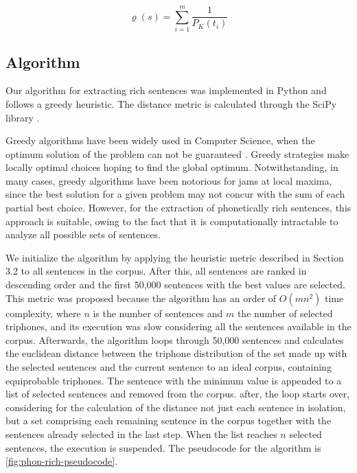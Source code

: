 \begin{equation}
\varrho(s) = \sum_{i=1}^{m} \frac{1}{P_K(t_i)}
\end{equation}


\subsection{Algorithm}

Our algorithm for extracting rich sentences was implemented in Python and follows a greedy heuristic. The distance
metric is calculated through the SciPy library \cite{Scipy2014}.

Greedy algorithms have been widely used in Computer Science, when the optimum solution of the problem can 
not be guaranteed \cite{Coppin2010}. Greedy strategies  make locally optimal choices hoping to find the global 
optimum. Notwithstanding, in many cases, greedy algorithms have been notorious for jams at local maxima, since the best solution 
for a given problem may not concur with the sum of each partial best choice. However, for the extraction of
phonetically rich sentences, this approach is suitable, owing to the fact that it is computationally intractable
to analyze all possible sets of sentences.

We initialize the algorithm by applying the heuristic metric described in Section 3.2 to all sentences in the 
corpus. After this, all sentences are ranked in descending order and the first 50,000 sentences with 
the best values are selected. This metric was proposed because the algorithm has an order of $O(mn^2)$ time complexity, 
where $n$ is the number of sentences and $m$ the number of selected triphones, and its execution was slow considering
all the sentences available in the corpus. Afterwards, the algorithm loops through 50,000 sentences and calculates 
the euclidean distance between the triphone distribution of the set made up with the selected sentences and the current sentence to an ideal corpus, containing equiprobable triphones. The sentence with the minimum value is appended to a list 
of selected sentences and removed from the corpus. after, the loop starts over, considering for the 
calculation of the distance not just each sentence in isolation, but a set comprising each remaining 
sentence in the corpus together with the sentences already selected in the last step. When the list reaches 
$n$ selected sentences, the execution is suspended. The pseudocode for the algorithm is \autoref{fig:phon-rich-pseudocode}.


